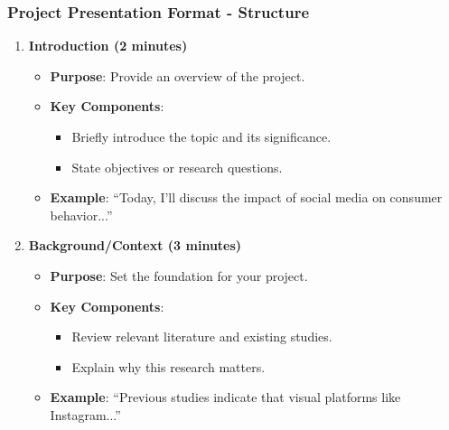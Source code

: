 \documentclass[aspectratio=169]{beamer}
\begin{document}
\begin{frame}[fragile]
    \frametitle{Project Presentation Format - Structure}
    \begin{enumerate}
        \item \textbf{Introduction (2 minutes)}
        \begin{itemize}
            \item \textbf{Purpose}: Provide an overview of the project.
            \item \textbf{Key Components}:
            \begin{itemize}
                \item Briefly introduce the topic and its significance.
                \item State objectives or research questions.
            \end{itemize}
            \item \textbf{Example}: ``Today, I’ll discuss the impact of social media on consumer behavior...''
        \end{itemize}
        
        \item \textbf{Background/Context (3 minutes)}
        \begin{itemize}
            \item \textbf{Purpose}: Set the foundation for your project.
            \item \textbf{Key Components}:
            \begin{itemize}
                \item Review relevant literature and existing studies.
                \item Explain why this research matters.
            \end{itemize}
            \item \textbf{Example}: ``Previous studies indicate that visual platforms like Instagram...''
        \end{itemize}
    \end{enumerate}
\end{frame}
\end{document}
